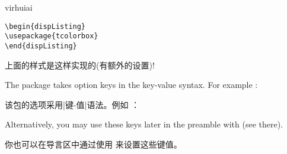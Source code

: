 
\begin{引述之言}{virhuiai}
\begin{verbatim}
\begin{dispListing}
\usepackage{tcolorbox}
\end{dispListing}
\end{verbatim}
上面的样式是这样实现的(有额外的设置)!
\end{引述之言}

% 


%   


The package takes option keys in the key-value syntax.%
For example%
:

该包的选项采用|键-值|语法。例如%
：




\begin{dispListing}
\usepackage[listings]{tcolorbox}
\end{dispListing}

Alternatively, you may use these keys later in the preamble with  (see there).

你也可以在导言区中通过使用  来设置这些键值。%




